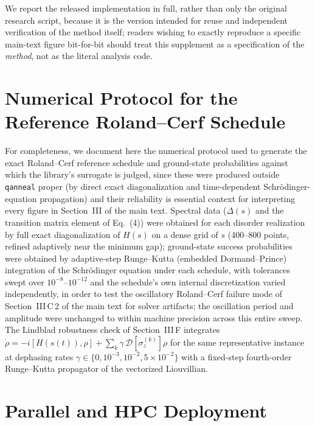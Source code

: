 \documentclass[11pt]{article}
\begin{document}
We report the released implementation in full, rather than only the original research script,
because it is the version intended for reuse and independent verification of the method itself;
readers wishing to exactly reproduce a specific main-text figure bit-for-bit should treat this
supplement as a specification of the \emph{method}, not as the literal analysis code.

\section{Numerical Protocol for the Reference Roland--Cerf Schedule}
\label{sec:rc-numerics}

For completeness, we document here the numerical protocol used to generate the exact
Roland--Cerf reference schedule and ground-state probabilities against which the library's
surrogate is judged, since these were produced outside \texttt{qanneal} proper (by direct exact
diagonalization and time-dependent Schr\"odinger-equation propagation) and their reliability is
essential context for interpreting every figure in Section~III of the main text. Spectral data
($\Delta(s)$ and the transition matrix element of Eq.~(4)) were obtained for each disorder
realization by full exact diagonalization of $H(s)$ on a dense grid of $s$ (400--800 points,
refined adaptively near the minimum gap); ground-state success probabilities were obtained by
adaptive-step Runge--Kutta (embedded Dormand--Prince) integration of the Schr\"odinger equation
under each schedule, with tolerances swept over $10^{-8}$--$10^{-12}$ and the schedule's own
internal discretization varied independently, in order to test the oscillatory Roland--Cerf
failure mode of Section~III\,C\,2 of the main text for solver artifacts; the oscillation period
and amplitude were unchanged to within machine precision across this entire sweep. The Lindblad
robustness check of Section~III\,F integrates $\dot\rho=-i[H(s(t)),\rho]+\sum_k\gamma\,
\mathcal D[\sigma_z^{(k)}]\rho$ for the same representative instance at dephasing rates
$\gamma\in\{0,10^{-3},10^{-2},5\times10^{-2}\}$ with a fixed-step fourth-order Runge--Kutta
propagator of the vectorized Liouvillian.

\section{Parallel and HPC Deployment}
\label{sec:hpc}
\end{document}
